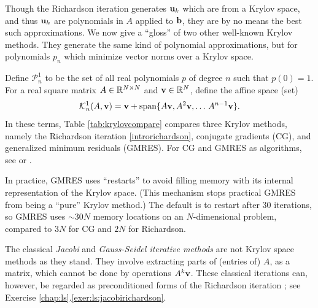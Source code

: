 Though the Richardson iteration generates $\mathbf{u}_k$ which are from a Krylov space, and thus $\mathbf{u}_k$ are polynomials in $A$ applied to $\mathbf{b}$, they are by no means the best such approximations.  We now give a ``gloss'' of two other well-known Krylov methods.  They generate the same kind of polynomial approximations, but for polynomials $p_n$ which minimize vector norms over a Krylov space.

\newcommand{\Pnone}{\mathcal{P}_n^1}
\newcommand{\Kone}[2]{\mathcal{K}_{#1}^1(#2)}
Define $\Pnone$ to be the set of all real polynomials $p$ of degree $n$ such that $p(0)=1$.  For a real square matrix $A \in \mathbb{R}^{N\times N}$ and $\mathbf{v}\in\mathbb{R}^N$, define the affine space (set)
\begin{equation}
\Kone{n}{A,\bv} = \bv + \Span\{A\bv,A^2\bv,\dots\,A^{n-1}\bv\}.
\end{equation}
In these terms, Table \ref{tab:krylovcompare} compares three Krylov methods, namely the Richardson iteration \eqref{introrichardson}, conjugate gradients (CG), and generalized minimum residuals (GMRES).  For CG and GMRES as algorithms, see \citet{Greenbaum1997} or \citet{Saad2003}.

In practice, GMRES uses ``restarts'' to avoid filling memory with its internal representation of the Krylov space.  (This mechanism stops practical GMRES from being a ``pure'' Krylov method.)  The \PETSc default is to restart after 30 iterations, so GMRES uses $\sim 30N$ memory locations on an $N$-dimensional problem, compared to $3N$ for CG and $2N$ for Richardson.

The classical \emph{Jacobi} and \emph{Gauss-Seidel iterative methods} \citep{Greenbaum1997} are not Krylov space methods as they stand.  They involve extracting parts of (entries of) $A$, as a matrix, which cannot be done by operations $A^k\mathbf{v}$.  These classical iterations can, however, be regarded as preconditioned forms of the Richardson iteration \citep{Greenbaum1997}; see Exercise \ref{chap:ls}.\ref{exer:ls:jacobirichardson}.

